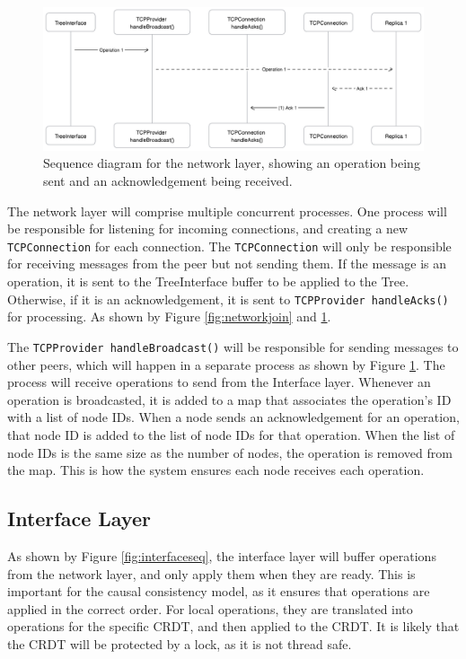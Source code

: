 \documentclass[12pt]{report}
\begin{document}
\begin{figure}[h]
    \centering
    \includegraphics[width=1\textwidth]{images/networksend.png}
    \caption{Sequence diagram for the network layer, showing an operation being sent and an acknowledgement being received.}
    \label{fig:networksend}
\end{figure} 

The network layer will comprise multiple concurrent processes. One process will be responsible for listening for incoming connections, and creating a new \texttt{TCPConnection} for each connection. The \texttt{TCPConnection} will only be responsible for receiving messages from the peer but not sending them. If the message is an operation, it is sent to the TreeInterface buffer to be applied to the Tree. Otherwise, if it is an acknowledgement, it is sent to \texttt{TCPProvider handleAcks()} for processing. As shown by Figure \ref{fig:networkjoin} and \ref{fig:networksend}. \par

The \texttt{TCPProvider handleBroadcast()} will be responsible for sending messages to other peers, which will happen in a separate process as shown by Figure \ref{fig:networksend}. The process will receive operations to send from the Interface layer. Whenever an operation is broadcasted, it is added to a map that associates the operation's ID with a list of node IDs. When a node sends an acknowledgement for an operation, that node ID is added to the list of node IDs for that operation. When the list of node IDs is the same size as the number of nodes, the operation is removed from the map. This is how the system ensures each node receives each operation. \par



\subsection{Interface Layer}

As shown by Figure \ref{fig:interfaceseq}, the interface layer will buffer operations from the network layer, and only apply them when they are ready. This is important for the causal consistency model, as it ensures that operations are applied in the correct order. For local operations, they are translated into operations for the specific CRDT, and then applied to the CRDT. It is likely that the CRDT will be protected by a lock, as it is not thread safe. \par
\end{document}
